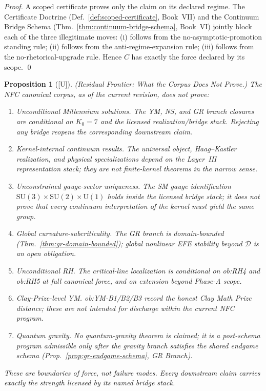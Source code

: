 \documentclass[12pt,oneside]{amsbook}
\theoremstyle{plain}
\newtheorem{proposition}[theorem]{Proposition}
\theoremstyle{definition}
\theoremstyle{remark}
\newcommand{\status}[1]{\textup{[#1]}}
\begin{document}
\begin{proof}
A scoped certificate proves only the claim on its declared regime.
The Certificate Doctrine (Def.~\ref{def:scoped-certificate},
Book~VII) and the Continuum Bridge Schema
(Thm.~\ref{thm:continuum-bridge-schema}, Book~VI) jointly block
each of the three illegitimate moves: (i) follows from the
no-asymptotic-promotion standing rule; (ii) follows from the
anti-regime-expansion rule; (iii) follows from the no-rhetorical-upgrade
rule.  Hence $C$ has exactly the force declared by its scope. \qed
\end{proof}

\begin{proposition}[\status{U}]\label{prop:what-corpus-does-not-prove}
\textup{(Residual Frontier: What the Corpus Does Not Prove.)}
The NFC canonical corpus, as of the current revision, does not prove:
\begin{enumerate}[label=\textup{(\arabic*)}]
  \item \emph{Unconditional Millennium solutions.}  The YM, NS, and
    GR branch closures are conditional on $K_0 = 7$ and the
    licensed realization/bridge stack.  Rejecting any bridge
    reopens the corresponding downstream claim.
  \item \emph{Kernel-internal continuum results.}  The universal
    object, Haag--Kastler realization, and physical specializations
    depend on the Layer~III representation stack; they are not
    finite-kernel theorems in the narrow sense.
  \item \emph{Unconstrained gauge-sector uniqueness.}  The SM gauge
    identification $\mathrm{SU}(3) \times \mathrm{SU}(2) \times
    \mathrm{U}(1)$ holds inside the licensed bridge stack; it does
    not prove that every continuum interpretation of the kernel must
    yield the same group.
  \item \emph{Global curvature-subcriticality.}  The GR branch is
    domain-bounded (Thm.~\ref{thm:gr-domain-bounded}); global
    nonlinear EFE stability beyond $\mathcal{D}$ is an open
    obligation.
  \item \emph{Unconditional RH.}  The critical-line localization is
    conditional on ob:RH4 and ob:RH5 at full canonical force, and on
    extension beyond Phase-A scope.
  \item \emph{Clay-Prize-level YM.}  ob:YM-B1/B2/B3 record the
    honest Clay Math Prize distance; these are not intended for
    discharge within the current NFC program.
  \item \emph{Quantum gravity.}  No quantum-gravity theorem is
    claimed; it is a post-schema program admissible only after the
    gravity branch satisfies the shared endgame schema
    (Prop.~\ref{prop:gr-endgame-schema}, GR Branch).
\end{enumerate}
These are boundaries of force, not failure modes.  Every downstream
claim carries exactly the strength licensed by its named bridge stack.
\end{proposition}
\end{document}
